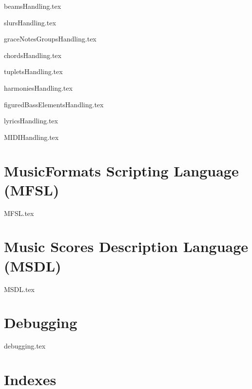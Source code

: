 \documentclass[11pt,a4paper]{report}
\begin{document}
{beamsHandling.tex}

{slursHandling.tex}

{graceNotesGroupsHandling.tex}

{chordsHandling.tex}

{tupletsHandling.tex}

{harmoniesHandling.tex}

{figuredBassElementsHandling.tex}

{lyricsHandling.tex}

{MIDIHandling.tex}


\part{MusicFormats Scripting Language (MFSL)}

{MFSL.tex}


\part{Music Scores Description Language (MSDL)}

{MSDL.tex}


\part{Debugging}

{debugging.tex}



\part{Indexes}
\end{document}
